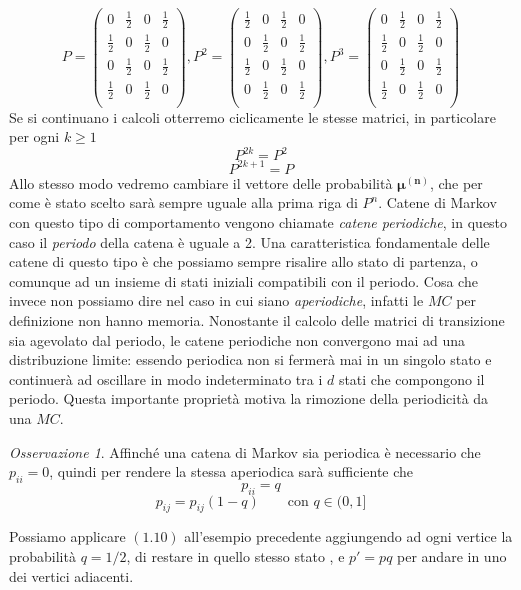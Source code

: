 \documentclass{article}
\theoremstyle{definition}
\theoremstyle{remark}
\newtheorem{remark}[theorem]{Osservazione}
\begin{document}
$$ P =\begin{pmatrix}
        0           & \frac{1}{2} & 0           & \frac{1}{2} \\
        \frac{1}{2} & 0           & \frac{1}{2} & 0           \\
        0           & \frac{1}{2} & 0           & \frac{1}{2} \\
        \frac{1}{2} & 0           & \frac{1}{2} & 0           \\
    \end{pmatrix},P^2 =\begin{pmatrix}
        \frac{1}{2} & 0           & \frac{1}{2} & 0           \\
        0           & \frac{1}{2} & 0           & \frac{1}{2} \\
        \frac{1}{2} & 0           & \frac{1}{2} & 0           \\
        0           & \frac{1}{2} & 0           & \frac{1}{2} \\
    \end{pmatrix}, P^3 =\begin{pmatrix}
        0           & \frac{1}{2} & 0           & \frac{1}{2} \\
        \frac{1}{2} & 0           & \frac{1}{2} & 0           \\
        0           & \frac{1}{2} & 0           & \frac{1}{2} \\
        \frac{1}{2} & 0           & \frac{1}{2} & 0           \\
    \end{pmatrix}$$
Se si continuano i calcoli otterremo ciclicamente le stesse matrici, in particolare  per ogni $k\ge 1$
$$P^{2k} = P^2$$
$$P^{2k+1} = P$$
Allo stesso modo vedremo cambiare il vettore delle probabilità $\boldsymbol{\mu^{(n)}}$, che per come è stato scelto sarà sempre uguale alla prima riga di $P^n$.
Catene di Markov con questo tipo di comportamento vengono chiamate \textit{catene periodiche}, in questo caso il \textit{periodo} della catena è uguale a 2.
Una caratteristica fondamentale delle catene di questo tipo è che possiamo sempre risalire allo stato di partenza, o comunque ad un insieme di stati iniziali compatibili
con il periodo.
Cosa che invece non possiamo dire nel caso in cui  siano \textit{aperiodiche}, infatti le $MC$ per definizione
non hanno memoria.
Nonostante il calcolo delle matrici di transizione sia agevolato dal periodo, le catene periodiche non convergono mai
ad una distribuzione limite: essendo periodica non si fermerà mai in un singolo stato e continuerà ad oscillare
in modo indeterminato tra i $d$ stati  che compongono il periodo. Questa importante proprietà motiva la rimozione della
periodicità da una $MC$.
\begin{remark}
    Affinché una catena di Markov sia periodica è necessario che $p_{ii} = 0$, quindi per rendere la stessa aperiodica sarà sufficiente che
    $$p_{ii} = q$$
    $$p_{ij} = p_{ij}(1-q) \qquad \text{con $q\in(0,1]$}$$
\end{remark}
Possiamo applicare $(1.10)$ all'esempio precedente aggiungendo ad ogni vertice la probabilità $q=1/2$, di restare in quello stesso stato , e $p' = pq$ per andare in uno dei vertici adiacenti.
\end{document}
